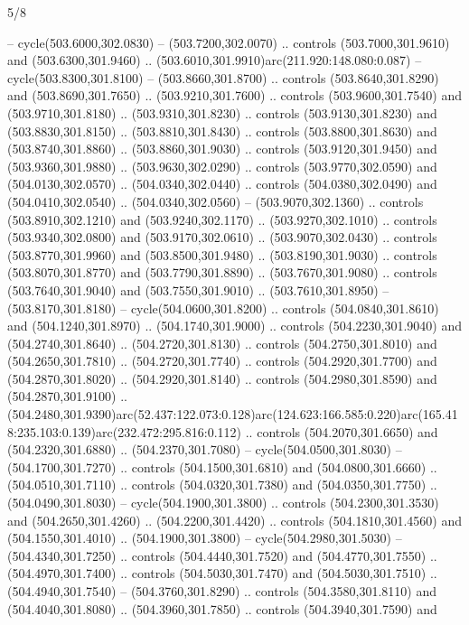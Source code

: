 \begin{flagdescription}{5/8}
\begin{scope}[xshift=0.5\flaglength,yshift=0.5\flagwidth,scale=\flagwidth/475.63]
\begin{scope}[y=0.8pt, x=0.8pt, yscale=-1, xscale=1,shift={(-450,-300)}]
\begin{scope}[cm={{1.0,0.0,0.0,1.0,(-0.0002,0.12556)}},cm={{1.0,0.0,0.0,1.0,(0.00179,0.0)}}]
\begin{scope}[cm={{1.11592,0.0,0.0,1.11592,(-106.89933,-41.77764)}}]
\begin{scope}[draw=black,fill=cfff]
\begin{scope}[fill=black]
  -- cycle(503.6000,302.0830) -- (503.7200,302.0070) .. controls
  (503.7000,301.9610) and (503.6300,301.9460) ..
  (503.6010,301.9910)arc(211.920:148.080:0.087) -- cycle(503.8300,301.8100) --
  (503.8660,301.8700) .. controls (503.8640,301.8290) and (503.8690,301.7650) ..
  (503.9210,301.7600) .. controls (503.9600,301.7540) and (503.9710,301.8180) ..
  (503.9310,301.8230) .. controls (503.9130,301.8230) and (503.8830,301.8150) ..
  (503.8810,301.8430) .. controls (503.8800,301.8630) and (503.8740,301.8860) ..
  (503.8860,301.9030) .. controls (503.9120,301.9450) and (503.9360,301.9880) ..
  (503.9630,302.0290) .. controls (503.9770,302.0590) and (504.0130,302.0570) ..
  (504.0340,302.0440) .. controls (504.0380,302.0490) and (504.0410,302.0540) ..
  (504.0340,302.0560) -- (503.9070,302.1360) .. controls (503.8910,302.1210) and
  (503.9240,302.1170) .. (503.9270,302.1010) .. controls (503.9340,302.0800) and
  (503.9170,302.0610) .. (503.9070,302.0430) .. controls (503.8770,301.9960) and
  (503.8500,301.9480) .. (503.8190,301.9030) .. controls (503.8070,301.8770) and
  (503.7790,301.8890) .. (503.7670,301.9080) .. controls (503.7640,301.9040) and
  (503.7550,301.9010) .. (503.7610,301.8950) -- (503.8170,301.8180) --
  cycle(504.0600,301.8200) .. controls (504.0840,301.8610) and
  (504.1240,301.8970) .. (504.1740,301.9000) .. controls (504.2230,301.9040) and
  (504.2740,301.8640) .. (504.2720,301.8130) .. controls (504.2750,301.8010) and
  (504.2650,301.7810) .. (504.2720,301.7740) .. controls (504.2920,301.7700) and
  (504.2870,301.8020) .. (504.2920,301.8140) .. controls (504.2980,301.8590) and
  (504.2870,301.9100) ..
  (504.2480,301.9390)arc(52.437:122.073:0.128)arc(124.623:166.585:0.220)arc(165.418:235.103:0.139)arc(232.472:295.816:0.112)
  .. controls (504.2070,301.6650) and (504.2320,301.6880) .. (504.2370,301.7080)
  -- cycle(504.0500,301.8030) -- (504.1700,301.7270) .. controls
  (504.1500,301.6810) and (504.0800,301.6660) .. (504.0510,301.7110) .. controls
  (504.0320,301.7380) and (504.0350,301.7750) .. (504.0490,301.8030) --
  cycle(504.1900,301.3800) .. controls (504.2300,301.3530) and
  (504.2650,301.4260) .. (504.2200,301.4420) .. controls (504.1810,301.4560) and
  (504.1550,301.4010) .. (504.1900,301.3800) -- cycle(504.2980,301.5030) --
  (504.4340,301.7250) .. controls (504.4440,301.7520) and (504.4770,301.7550) ..
  (504.4970,301.7400) .. controls (504.5030,301.7470) and (504.5030,301.7510) ..
  (504.4940,301.7540) -- (504.3760,301.8290) .. controls (504.3580,301.8110) and
  (504.4040,301.8080) .. (504.3960,301.7850) .. controls (504.3940,301.7590) and

\end{scope}
\end{scope}
\end{scope}
\end{scope}
\end{scope}
\end{scope}
\end{flagdescription}
